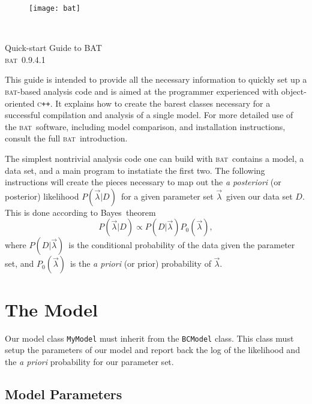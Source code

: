 \documentclass[a4paper,11pt]{article}
\newcommand{\acronym}[1]{\textsc{#1}}
\newcommand{\BAT}{\acronym{bat}}
\newcommand{\C}{\textsc{c}}
\newcommand{\CPP}{\C\texttt{++}}
\newcommand{\Icode}[1]{\texttt{#1}}
\newcommand{\BProb}[2]{\ensuremath{P(#1|#2)}}
\newcommand{\BPars}{\ensuremath{\vec{\lambda}}}
\newcommand{\BData}{\ensuremath{D}}
\newcommand{\BPrior}{\ensuremath{P_0(\BPars)}}
\newcommand{\BPosterior}{\BProb{\BPars}{\BData}}
\newcommand{\BConditional}{\BProb{\BData}{\BPars}}
\begin{document}

\begin{figure}[t]
\texttt{[image: bat]}
\end{figure}
\quad\\
\vspace{2\baselineskip}

\begin{center}
  {\Large Quick-start Guide to BAT}\\
  \vspace{1\baselineskip}
  {\large \BAT\ 0.9.4.1}
\end{center}

\vspace{4\baselineskip}

This guide is intended to provide all the necessary information to
quickly set up a \BAT-based analysis code and is aimed at the
programmer experienced with object-oriented \CPP. It explains how to
create the barest classes necessary for a successful compilation and
analysis of a single model. For more detailed use of the \BAT\
software, including model comparison, and installation instructions,
consult the full \BAT\ introduction.

The simplest nontrivial analysis code one can build with \BAT\
contains a model, a data set, and a main program to instatiate the
first two. The following instructions will create the pieces necessary
to map out the \emph{a posteriori} (or posterior) likelihood
\BPosterior\ for a given parameter set \BPars\ given our data set
\BData.  This is done according to Bayes\ theorem
\begin{displaymath}
  \BPosterior \propto \BConditional\BPrior,
\end{displaymath}
where \BConditional\ is the conditional probability of the data given
the parameter set, and \BPrior\ is the \emph{a priori} (or prior)
probability of \BPars.

\section{The Model}

Our model class \Icode{MyModel} must inherit from the \Icode{BCModel}
class. This class must setup the parameters of our model and report
back the log of the likelihood and the \emph{a priori} probability for
our parameter set.

\subsection{Model Parameters}
\end{document}
